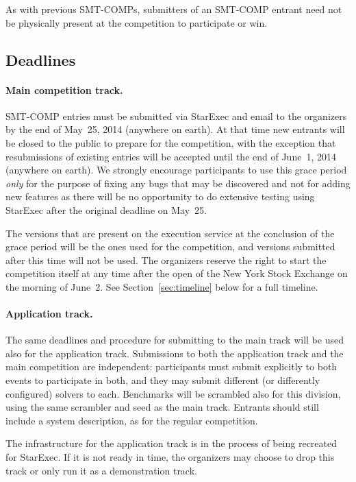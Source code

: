 \documentclass[12pt]{article}
\begin{document}
As with previous SMT-COMPs, submitters of an SMT-COMP entrant need not 
be physically present at the competition to
participate or win.

\subsection*{Deadlines} %


\paragraph{Main competition track.} %
SMT-COMP entries must be submitted via StarExec and email to the organizers by the end of May~25, 2014 (anywhere on earth).  At that time new entrants will be
closed to the public to prepare for the competition, with the
exception that resubmissions of existing entries will be accepted
until the end of June~1, 2014 (anywhere on earth).  We strongly encourage
participants to use this grace period \emph{only} for the
purpose of fixing any bugs that may be discovered and not for adding
new features as there will be no opportunity to do extensive testing
using StarExec after the original deadline on May~25.

The versions that are present on the execution service at the conclusion of the
grace period will be the ones used for the competition, and versions
submitted after this time will not be used.  The organizers reserve
the right to start the competition itself at any time after the open
of the New York Stock Exchange on the morning of June~2.  See
Section~\ref{sec:timeline} below for a full timeline.

\paragraph{Application track.} %
The same deadlines and procedure for submitting to the main track will be used
also for the application track. Submissions to both the application track and
the main competition are independent: participants must submit explicitly to
both events to participate in both, and they may submit different (or
differently configured) solvers to each.  Benchmarks will be scrambled also
for this division, using the same scrambler and seed as the main track.
Entrants should still include a system description, as for the regular
competition.

The infrastructure for the application track is in the process of being recreated for StarExec.
If it is not ready in time, the organizers may choose to drop this track or only run it as a demonstration track.
\end{document}
